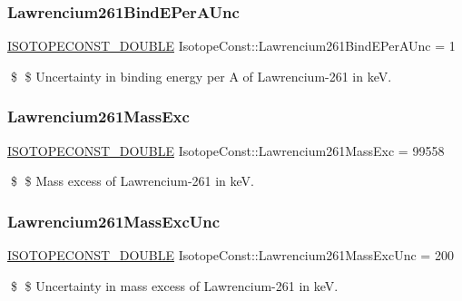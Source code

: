 \subsubsection{\texorpdfstring{Lawrencium261\+Bind\+E\+Per\+A\+Unc}{Lawrencium261BindEPerAUnc}}
{\footnotesize\ttfamily \mbox{\hyperlink{group___isotope_const-_macros_ga8f45a7272ce02c0b4c65c44636ed719a}{I\+S\+O\+T\+O\+P\+E\+C\+O\+N\+S\+T\+\_\+\+D\+O\+U\+B\+LE}} Isotope\+Const\+::\+Lawrencium261\+Bind\+E\+Per\+A\+Unc = 1}

\$ \$ Uncertainty in binding energy per A of Lawrencium-\/261 in keV. \mbox{\label{group___isotope_const-_lawrencium-_lr261_gab6c655b855e11f6d30b474fa4fc1f24b}} 
\subsubsection{\texorpdfstring{Lawrencium261\+Mass\+Exc}{Lawrencium261MassExc}}
{\footnotesize\ttfamily \mbox{\hyperlink{group___isotope_const-_macros_ga8f45a7272ce02c0b4c65c44636ed719a}{I\+S\+O\+T\+O\+P\+E\+C\+O\+N\+S\+T\+\_\+\+D\+O\+U\+B\+LE}} Isotope\+Const\+::\+Lawrencium261\+Mass\+Exc = 99558}

\$ \$ Mass excess of Lawrencium-\/261 in keV. \mbox{\label{group___isotope_const-_lawrencium-_lr261_gae18f98ceac86794efed6176a5bf87a5f}} 
\subsubsection{\texorpdfstring{Lawrencium261\+Mass\+Exc\+Unc}{Lawrencium261MassExcUnc}}
{\footnotesize\ttfamily \mbox{\hyperlink{group___isotope_const-_macros_ga8f45a7272ce02c0b4c65c44636ed719a}{I\+S\+O\+T\+O\+P\+E\+C\+O\+N\+S\+T\+\_\+\+D\+O\+U\+B\+LE}} Isotope\+Const\+::\+Lawrencium261\+Mass\+Exc\+Unc = 200}

\$ \$ Uncertainty in mass excess of Lawrencium-\/261 in keV. \mbox{\label{group___isotope_const-_lawrencium-_lr261_gac9aa722e3a4a84d1cd0be252c0c594f5}} 
